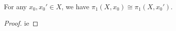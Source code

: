 
\begin{lemma}\label{lma:khsbh}
	For any $x_0,x_0'\in X$, we have $\pi _1(X,x_0)\cong \pi _1(X,x_0')$.
\end{lemma}
\begin{proof}
	ie
\end{proof}

